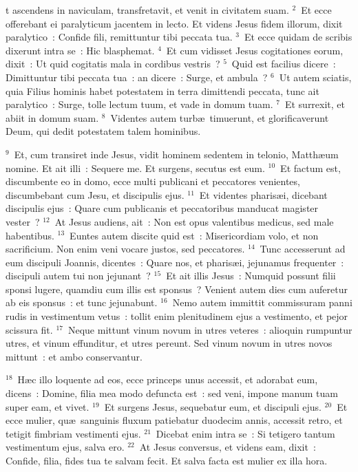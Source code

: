 \bchapter
{}t ascendens in naviculam, transfretavit, et venit in civitatem suam.
${}^{2}$~Et ecce offerebant ei paralyticum jacentem in lecto. Et videns Jesus fidem illorum, dixit paralytico~: Confide fili, remittuntur tibi peccata tua.
${}^{3}$~Et ecce quidam de scribis dixerunt intra se~: Hic blasphemat.
${}^{4}$~Et cum vidisset Jesus cogitationes eorum, dixit~: Ut quid cogitatis mala in cordibus vestris~?
${}^{5}$~Quid est facilius dicere~: Dimittuntur tibi peccata tua~: an dicere~: Surge, et ambula~?
${}^{6}$~Ut autem sciatis, quia Filius hominis habet potestatem in terra dimittendi peccata, tunc ait paralytico~: Surge, tolle lectum tuum, et vade in domum tuam.
${}^{7}$~Et surrexit, et abiit in domum suam.
${}^{8}$~Videntes autem turb\ae\ timuerunt, et glorificaverunt Deum, qui dedit potestatem talem hominibus.


${}^{9}$~Et, cum transiret inde Jesus, vidit hominem sedentem in telonio, Matth\ae um nomine. Et ait illi~: Sequere me. Et surgens, secutus est eum.
${}^{10}$~Et factum est, discumbente eo in domo, ecce multi publicani et peccatores venientes, discumbebant cum Jesu, et discipulis ejus.
${}^{11}$~Et videntes pharis\ae i, dicebant discipulis ejus~: Quare cum publicanis et peccatoribus manducat magister vester~?
${}^{12}$~At Jesus audiens, ait~: Non est opus valentibus medicus, sed male habentibus.
${}^{13}$~Euntes autem discite quid est~: Misericordiam volo, et non sacrificium. Non enim veni vocare justos, sed peccatores.
${}^{14}$~Tunc accesserunt ad eum discipuli Joannis, dicentes~: Quare nos, et pharis\ae i, jejunamus frequenter~: discipuli autem tui non jejunant~?
${}^{15}$~Et ait illis Jesus~: Numquid possunt filii sponsi lugere, quamdiu cum illis est sponsus~? Venient autem dies cum auferetur ab eis sponsus~: et tunc jejunabunt.
${}^{16}$~Nemo autem immittit commissuram panni rudis in vestimentum vetus~: tollit enim plenitudinem ejus a vestimento, et pejor scissura fit.
${}^{17}$~Neque mittunt vinum novum in utres veteres~: alioquin rumpuntur utres, et vinum effunditur, et utres pereunt. Sed vinum novum in utres novos mittunt~: et ambo conservantur.


${}^{18}$~H\ae c illo loquente ad eos, ecce princeps unus accessit, et adorabat eum, dicens~: Domine, filia mea modo defuncta est~: sed veni, impone manum tuam super eam, et vivet.
${}^{19}$~Et surgens Jesus, sequebatur eum, et discipuli ejus.
${}^{20}$~Et ecce mulier, qu\ae\ sanguinis fluxum patiebatur duodecim annis, accessit retro, et tetigit fimbriam vestimenti ejus.
${}^{21}$~Dicebat enim intra se~: Si tetigero tantum vestimentum ejus, salva ero.
${}^{22}$~At Jesus conversus, et videns eam, dixit~: Confide, filia, fides tua te salvam fecit. Et salva facta est mulier ex illa hora.


